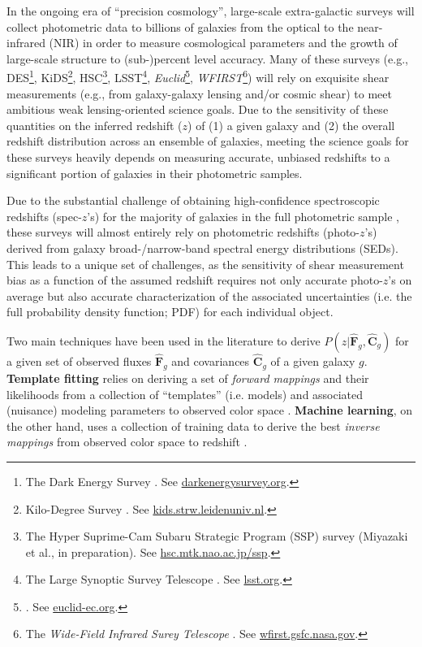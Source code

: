\documentclass[a4paper,fleqn,usenatbib,english]{mnras}
\newcommand{\sz}{spec-$z$} %
\newcommand{\pz}{photo-$z$} %
\newcommand{\cz}{cluster-$z$} %
\newcommand{\josh}[1]{\textcolor{red}{\textbf{#1}}}
\begin{document}
In the ongoing era of ``precision cosmology'', large-scale extra-galactic surveys will collect photometric data to billions of galaxies from the optical to the near-infrared (NIR) in order to measure cosmological parameters and the growth of large-scale structure to (sub-)percent level accuracy. Many of these surveys (e.g., DES\footnote{The Dark Energy Survey \citep{des05}. See \url{darkenergysurvey.org}.}, KiDS\footnote{Kilo-Degree Survey \citep{dejong+13}. See \url{kids.strw.leidenuniv.nl}.}, HSC\footnote{The Hyper Suprime-Cam \citep[HSC;][]{miyazaki+12} Subaru Strategic Program (SSP) survey (Miyazaki et al., in preparation). See \url{hsc.mtk.nao.ac.jp/ssp}.}, LSST\footnote{The Large Synoptic Survey Telescope \citep{ivezic+08}. See \url{lsst.org}.}, \textit{Euclid}\footnote{\citet{laureijs+11}. See \url{euclid-ec.org}.}, \textit{WFIRST}\footnote{The \textit{Wide-Field Infrared Surey Telescope} \citep{spergel+15}. See \url{wfirst.gsfc.nasa.gov}.}) will rely on exquisite shear measurements (e.g., from galaxy-galaxy lensing and/or cosmic shear) to meet ambitious weak lensing-oriented science goals. Due to the sensitivity of these quantities on the inferred redshift ($z$) of (1) a given galaxy and (2) the overall redshift distribution across an ensemble of galaxies, meeting the science goals for these surveys heavily depends on measuring accurate, unbiased redshifts to a significant portion of galaxies in their photometric samples.

Due to the substantial challenge of obtaining high-confidence spectroscopic redshifts (\sz's) for the majority of galaxies in the full photometric sample \citep{masters+15}, these surveys will almost entirely rely on photometric redshifts (\pz's) derived from galaxy broad-/narrow-band spectral energy distributions (SEDs).
This leads to a unique set of challenges, as the sensitivity of shear measurement bias as a function of the assumed redshift requires not only accurate \pz's on average but also accurate characterization of the associated uncertainties (i.e. the full probability density function; PDF) for each individual object.

Two main techniques have been used in the literature to derive $P(z|\mathbf{\hat{F}}_g,\mathbf{\hat{C}}_g)$ for a given set of observed fluxes $\mathbf{\hat{F}}_g$ and covariances $\mathbf{\hat{C}}_g$ of a given galaxy $g$. \textbf{Template fitting} relies on deriving a set of \textit{forward mappings} and their likelihoods from a collection of ``templates'' (i.e. models) and associated (nuisance) modeling parameters to observed color space \citep[e.g.,][]{arnouts+99,benitez00,bolzonella+00,ilbert+06,cool+13,johnson+13,tanaka15}. \textbf{Machine learning}, on the other hand, uses a collection of training data to derive the best \textit{inverse mappings} from observed color space to redshift \citep[e.g.,][]{sheldon+12,carrascokindbrunner13,hoyle16,elliott+16,almosallam+16b}.
\end{document}
